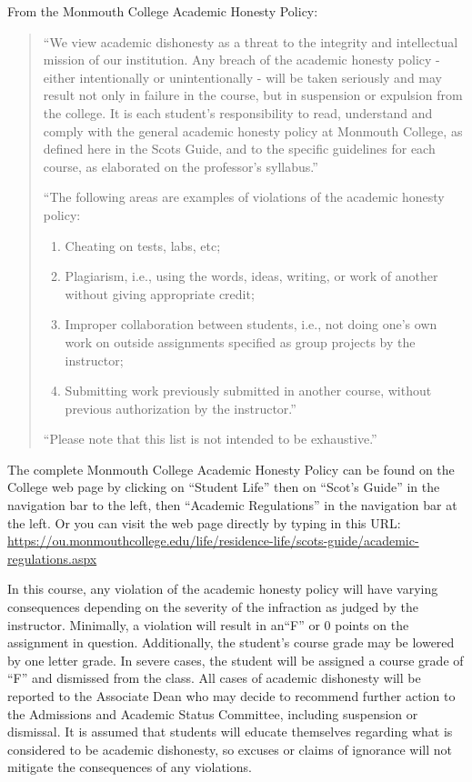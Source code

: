 \documentclass[10pt]{article}
\begin{document}
From the Monmouth College Academic Honesty Policy:
\begin{quote}
  ``We view academic dishonesty as a threat to the integrity and intellectual mission of our institution. Any breach of the academic honesty policy - either intentionally or unintentionally - will be taken seriously and may result not only in failure in the course, but in suspension or expulsion from the college. It is each student’s responsibility to read, understand and comply with the general academic honesty policy at Monmouth College, as defined here in the Scots Guide, and to the specific guidelines for each course, as elaborated on the professor’s syllabus.''

  ``The following areas are examples of violations of the academic honesty policy:
  \begin{enumerate}
  \item Cheating on tests, labs, etc;
  \item Plagiarism, i.e., using the words, ideas, writing, or work of another without giving appropriate credit;
  \item Improper collaboration between students, i.e., not doing one’s own work on outside assignments specified as group projects by the instructor;
  \item Submitting work previously submitted in another course, without previous authorization by the instructor.''
  \end{enumerate}

  ``Please note that this list is not intended to be exhaustive.''
\end{quote}

The complete Monmouth College Academic Honesty Policy can be found on the College web page by clicking on ``Student Life'' then on ``Scot’s Guide'' in the navigation bar to the left, then ``Academic Regulations'' in the navigation bar at the left.  Or you can visit the web page directly by typing in this URL: \url{https://ou.monmouthcollege.edu/life/residence-life/scots-guide/academic-regulations.aspx}

In this course, any violation of the academic honesty policy will have varying consequences depending on the severity of the infraction as judged by the instructor. Minimally, a violation will result in an``F'' or 0 points on the assignment in question. Additionally, the student’s course grade may be lowered by one letter grade. In severe cases, the student will be assigned a course grade of ``F'' and dismissed from the class. All cases of academic dishonesty will be reported to the Associate Dean who may decide to recommend further action to the Admissions and Academic Status Committee, including suspension or dismissal. It is assumed that students will educate themselves regarding what is considered to be academic dishonesty, so excuses or claims of ignorance will not mitigate the consequences of any violations.
\end{document}
